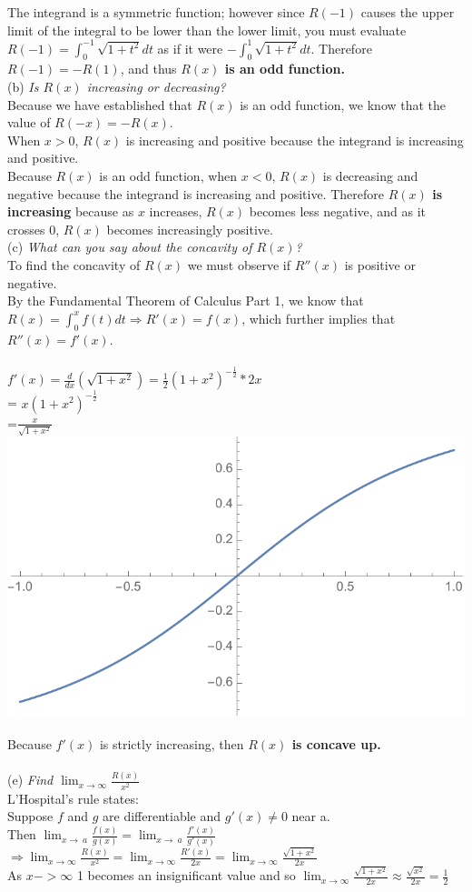 \documentclass[12pt]{article}
\begin{document}
The integrand is a symmetric function; however since $R(-1)$ causes the upper limit of the integral to be lower than the lower limit, you must evaluate $R(-1) = \int_{0}^{-1} \sqrt{1+t^2} dt $ as if it were $-\int_{0}^{1}\sqrt{1+t^2}dt$. Therefore $R(-1) = -R(1)$, and thus \textbf{$R(x)$ is an odd function.}
\\

\noindent (b) \textit{Is $R(x)$ increasing or decreasing?}\\
Because we have established that $R(x)$ is an odd function, we know that the value of $R(-x) = -R(x)$.\\
When $x>0$, $R(x)$ is increasing and positive because the integrand is increasing and positive.\\
Because $R(x)$ is an odd function, when $x<0$, $R(x)$ is decreasing and negative because the integrand is increasing and positive. 
Therefore \textbf{$R(x)$ is increasing} because as $x$ increases, $R(x)$ becomes less negative, and as it crosses 0, $R(x)$ becomes increasingly positive. \\

\noindent (c) \textit{What can you say about the concavity of $R(x)$?}\\
To find the concavity of $R(x)$ we must observe if $R''(x)$ is positive or negative. \\
By the Fundamental Theorem of Calculus Part 1, we know that $R(x) = \int_{0}^{x}f(t)dt \Rightarrow R'(x) = f(x)$, which further implies that $R''(x) = f'(x)$.\\
\\
$f'(x) = \frac{d}{dx}(\sqrt{1+x^2}) = \frac{1}{2}(1+x^2)^{-\frac{1}{2}}*2x$\\
= $x(1+x^2)^{-\frac{1}{2}}$\\
=$\frac{x}{\sqrt{1+x^2}}$ \\

\includegraphics[width=.45\textwidth]{c_graph.pdf}

\noindent Because $f'(x)$ is strictly increasing, then \textbf{$R(x)$ is concave up.}\\
\\
(e) \textit{Find $\lim_{x\to\infty}\frac{R(x)}{x^2}$} \\
L'Hospital's rule states:\\
Suppose $f$ and $g$ are differentiable and $g'(x) \neq 0$ near a. \\
Then $\lim_{x\to\ a} \frac{f(x)}{g(x)} = \lim_{x\to\ a} \frac{f'(x)}{g'(x)}$ \\
$\Rightarrow \lim_{x\to\infty}\frac{R(x)}{x^2} = \lim_{x\to\infty}\frac{R'(x)}{2x} = \lim_{x\to\infty}\frac{\sqrt{1+x^2}}{2x}$ \\
As $x -> \infty$ 1 becomes an insignificant value and so $\lim_{x\to\infty}\frac{\sqrt{1+x^2}}{2x} \approx \frac{\sqrt{x^2}}{2x} = \frac{1}{2}$ \pagebreak
\end{document}
